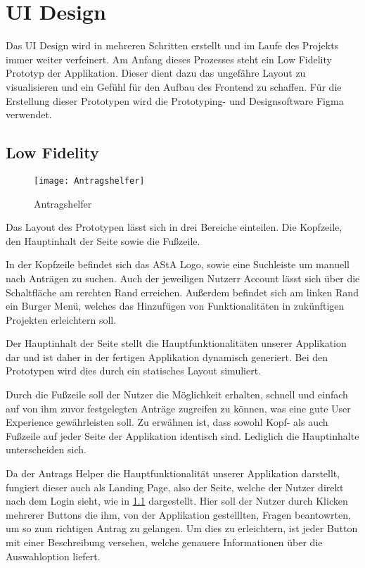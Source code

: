 \chapter{UI Design}\label{ch:ui-design}
Das UI Design wird in mehreren Schritten erstellt und im Laufe des Projekts immer weiter
verfeinert. Am Anfang dieses Prozesses steht ein Low Fidelity Prototyp der Applikation.
Dieser dient dazu das ungefähre Layout zu visualisieren und ein Gefühl für den Aufbau
des Frontend zu schaffen. Für die Erstellung dieser Prototypen wird die Prototyping- und
Designsoftware Figma verwendet.

\section{Low Fidelity}\label{Low Fidelity}
\begin{figure}[h]
  \centering
    \texttt{[image: Antragshelfer]}
    \caption{Antragshelfer}\label{Antragshelfer}
\end{figure}
Das Layout des Prototypen lässt sich in drei Bereiche einteilen. Die Kopfzeile, den
Hauptinhalt der Seite sowie die Fußzeile.

In der Kopfzeile befindet sich das AStA Logo, sowie eine Suchleiste um manuell nach
Anträgen zu suchen. Auch der jeweiligen Nutzerr Account lässt sich über die Schaltfläche
am rerchten Rand erreichen. Außerdem befindet sich am linken Rand ein Burger Menü,
welches das Hinzufügen von Funktionalitäten in zukünftigen Projekten erleichtern soll.

Der Hauptinhalt der Seite stellt die Hauptfunktionalitäten unserer Applikation dar und
ist daher in der fertigen Applikation dynamisch generiert. Bei den Prototypen wird dies
durch ein statisches Layout simuliert.

Durch die Fußzeile soll der Nutzer die Möglichkeit erhalten, schnell und einfach auf von
ihm zuvor festgelegten Anträge zugreifen zu können, was eine gute User Experience
gewährleisten soll. Zu erwähnen ist, dass sowohl Kopf- als auch Fußzeile auf jeder Seite
der Applikation identisch sind. Lediglich die Hauptinhalte unterscheiden sich.

Da der Antrags Helper die Hauptfunktionalität unserer Applikation darstellt, fungiert
dieser auch als Landing Page, also der Seite, welche der Nutzer direkt nach dem Login
sieht, wie in \ref{Antragshelfer} dargestellt. Hier soll der Nutzer durch Klicken mehrerer Buttons die
ihm, von der Applikation gestelllten, Fragen beantowrten, um so zum richtigen Antrag zu
gelangen. Um dies zu erleichtern, ist jeder Button mit einer Beschreibung versehen, welche genauere Informationen über die Auswahloption liefert.


